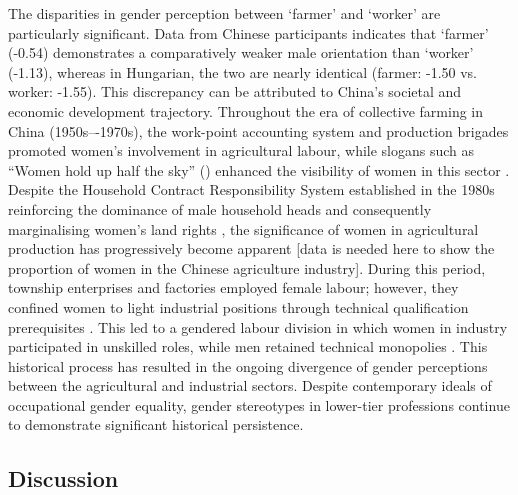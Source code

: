 \documentclass[11pt]{article}
\newcommand{\zh}[1]{\simplifiedchinesefont{#1}\rmfamily}
\begin{document}

The disparities in gender perception between `farmer' and `worker' are particularly significant. Data from Chinese participants indicates that `farmer' (-0.54) demonstrates a comparatively weaker male orientation than `worker' (-1.13), whereas in Hungarian, the two are nearly identical (farmer: -1.50 vs. worker: -1.55). This discrepancy can be attributed to China’s societal and economic development trajectory. Throughout the era of collective farming in China (1950s–-1970s), the work-point accounting system and production brigades promoted women's involvement in agricultural labour, while slogans such as ``Women hold up half the sky'' (\zh{妇女能顶半边天}) enhanced the visibility of women in this sector \citep{jacka_1997_agriculture,jacka_1997_domestic}. Despite the Household Contract Responsibility System established in the 1980s reinforcing the dominance of male household heads and consequently marginalising women's land rights \citep{zhu_2009_gender}, the significance of women in agricultural production has progressively become apparent [data is needed here to show the proportion of women in the Chinese agriculture industry]. During this period, township enterprises and factories employed female labour; however, they confined women to light industrial positions through technical qualification prerequisites \citep{liu_2007_gender}. This led to a gendered labour division in which women in industry participated in unskilled roles, while men retained technical monopolies \citep{bossen_2002_chinese}. This historical process has resulted in the ongoing divergence of gender perceptions between the agricultural and industrial sectors. Despite contemporary ideals of occupational gender equality, gender stereotypes in lower-tier professions continue to demonstrate significant historical persistence.




\subsection{Discussion}\label{sec:discussion}
\end{document}
